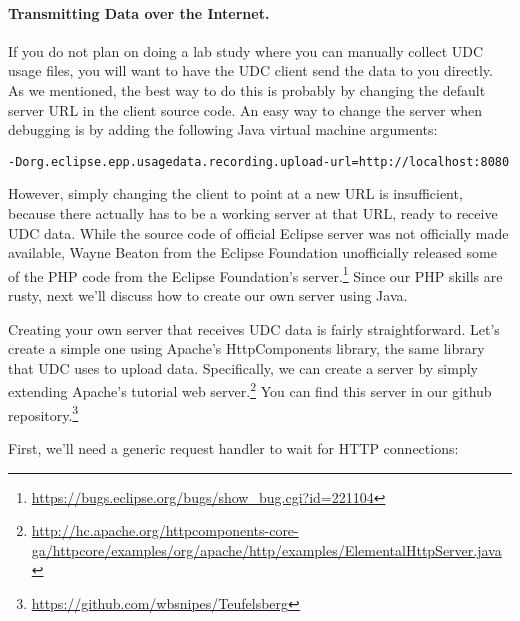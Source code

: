 \paragraph{Transmitting Data over the Internet.}

If you do not plan on doing a lab study where you can manually collect UDC usage
files, you will want to have the UDC client send the data to you directly.
As we mentioned, the best way to do this is probably by changing the default
server URL in the client source code.
An easy way to change the server when debugging is by adding the following Java
virtual machine arguments:

\begin{lstlisting}
-Dorg.eclipse.epp.usagedata.recording.upload-url=http://localhost:8080
\end{lstlisting}

\noindent
However, simply changing the client to point at a new URL is insufficient,
because there actually has to be a working server at that URL, ready to
receive UDC data.
While the source code of official Eclipse server was not officially made
available, Wayne Beaton from the Eclipse Foundation unofficially released
some of the PHP code from the Eclipse Foundation's server.\footnote{\url{https://bugs.eclipse.org/bugs/show_bug.cgi?id=221104}}
Since our PHP skills are rusty, next we'll discuss how to create our own 
server using Java.

Creating your own server that receives UDC data is fairly straightforward.
Let's create a simple one using Apache's HttpComponents library,
the same library that UDC uses to upload data.
Specifically, we can create a server by simply extending Apache's tutorial
web server.\footnote{\url{http://hc.apache.org/httpcomponents-core-ga/httpcore/examples/org/apache/http/examples/ElementalHttpServer.java}}
You can find this server in our github repository.\footnote{\url{https://github.com/wbsnipes/Teufelsberg}}

First, we'll need a generic request handler to wait for HTTP connections:

